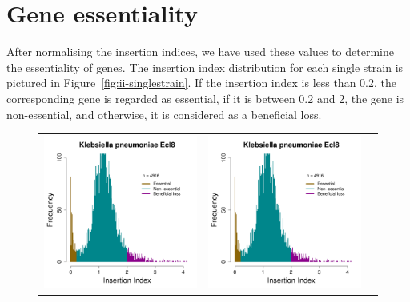 \documentclass[a4paper,10pt, twocolumn]{article}
\begin{document}
\section{Gene essentiality}
After normalising the insertion indices, we have used these values to determine the essentiality of genes. The insertion index distribution for each single strain is pictured in Figure~\ref{fig:ii-singlestrain}. If the insertion index is less than 0.2, the corresponding gene is regarded as essential, if it is between 0.2 and 2, the gene is non-essential, and otherwise, it is considered as a beneficial loss.

\begin{figure}
\centering
\begin{tabular}{c c c}
\includegraphics[page=1, scale=0.28]{per-species-insertion-index.pdf} &
\includegraphics[page=2, scale=0.28]{per-species-insertion-index.pdf} &

\end{tabular}
\end{figure}
\end{document}
